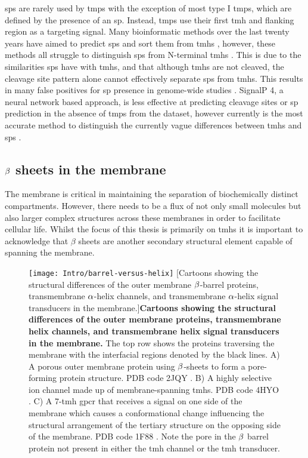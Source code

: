 \gls{sp}s are rarely used by \gls{tmp}s with the exception of most type I \gls{tmp}s, which are defined by the presence of an \gls{sp}.
Instead, \gls{tmp}s use their first \gls{tmh} and flanking region as a targeting signal.
Many bioinformatic methods over the last twenty years have aimed to predict \gls{sp}s and sort them from \gls{tmh}s \cite{Choo2009}, however, these methods all struggle to distinguish \gls{sp}s from N-terminal \gls{tmh}s \cite{Petersen2011}.
This is due to the similarities \gls{sp}s have with \gls{tmh}s, and that although \gls{tmh}s are not cleaved, the cleavage site pattern alone cannot effectively separate \gls{sp}s from \gls{tmh}s.
This results in many false positives for \gls{sp} presence in genome\--wide studies \cite{Petersen2011}.
SignalP 4, a neural network based approach, is less effective at predicting cleavage sites or \gls{sp} prediction in the absence of \gls{tmp}s from the dataset, however currently is the most accurate method to distinguish the currently vague differences between \gls{tmh}s and \gls{sp}s \cite{Petersen2011}.

\subsection{$\protect\beta$ sheets in the membrane}

The membrane is critical in maintaining the separation of biochemically distinct compartments.
However, there needs to be a flux of not only small molecules but also larger complex structures across these membranes in order to facilitate cellular life.
Whilst the focus of this thesis is primarily on \gls{tmh}s it is important to acknowledge that $\beta$ sheets are another secondary structural element capable of spanning the membrane.

\begin{figure}[ht]
\centering
\texttt{[image: Intro/barrel-versus-helix]}
		[Cartoons showing the structural differences of the outer membrane $\protect\beta$\--barrel proteins, transmembrane $\protect\alpha$\--helix channels, and transmembrane $\protect\alpha$\--helix signal transducers in the membrane.]{\textbf{Cartoons showing the structural differences of the outer membrane proteins, transmembrane helix channels, and transmembrane helix signal transducers in the membrane.}
		The top row shows the proteins traversing the membrane with the interfacial regions denoted by the black lines.
		A) A porous outer membrane protein using $\protect\beta$\--sheets to form a pore\--forming protein structure.
		PDB code 2JQY \cite{Liang2007}.
		B) A highly selective ion channel made up of membrane\--spanning \gls{tmh}s.
		PDB code 4HYO \cite{Posson2013}.
		C) A 7\--\gls{tmh} \gls{gpcr} that receives a signal on one side of the membrane which causes a conformational change influencing the structural arrangement of the tertiary structure on the opposing side of the membrane.
		PDB code 1F88 \cite{Palczewski2000}.
		Note the pore in the $\protect\beta$ barrel protein not present in either the \gls{tmh} channel or the \gls{tmh} transducer.
		}
\label{fig:barrel-versus-helix}
\end{figure}

